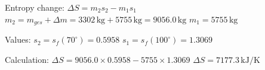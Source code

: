 Entropy change:  
\( \Delta S = m_2 s_2 - m_1 s_1 \)  
\( m_2 = m_{ges} + \Delta m = 3302 \, \text{kg} + 5755 \, \text{kg} = 9056.0 \, \text{kg} \)  
\( m_1 = 5755 \, \text{kg} \)  

Values:  
\( s_2 = s_f(70^\circ) = 0.5958 \)  
\( s_1 = s_f(100^\circ) = 1.3069 \)  

Calculation:  
\( \Delta S = 9056.0 \times 0.5958 - 5755 \times 1.3069 \)  
\( \Delta S = 7177.3 \, \text{kJ/K} \)